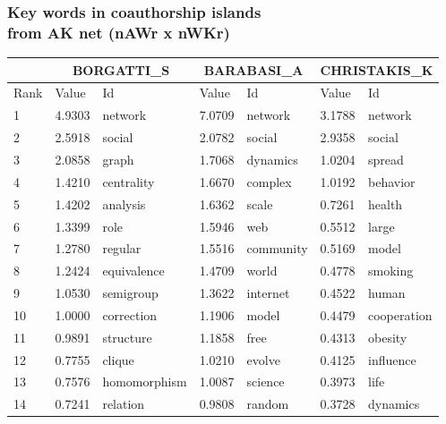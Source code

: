 \documentclass[hyperref={pdfstartview={FitBH -32768},
                         pdfpagemode=FullScreen,
                         plainpages=false,
                         colorlinks=true}
              ]{beamer}
\begin{document}
\begin{frame}[fragile]
\frametitle{Key words in coauthorship islands \\ \normalsize from AK net (nAWr x nWKr)}

\scriptsize
\renewcommand{\arraystretch}{0.84}
\begin{center}
\begin{tabular}{p{0.5cm}|p{0.8cm}|p{1.7cm}||p{0.8cm}|p{1.4cm}||p{0.8cm}|p{1.6cm}} \hline \hline
& \multicolumn{2}{c}{BORGATTI\_S}		& \multicolumn{2}{c}{BARABASI\_A}  & \multicolumn{2}{c}{CHRISTAKIS\_K}\\ \hline \hline
      Rank 	&   Value  & Id		    & 	   Value  & Id		       &	 Value  & Id	    \\ \hline
         1 	&  4.9303  & network	    &	    7.0709  & network	       &	  3.1788 &  network	    \\
         2 	&  2.5918  & social	    &	    2.0782  & social	       &	  2.9358 &  social	    \\
         3 	&  2.0858  & graph	    &	    1.7068  & dynamics	       &	  1.0204 &  spread	    \\
         4 	&  1.4210  & centrality	    &	    1.6670  & complex	       &	  1.0192 &  behavior	    \\
         5 	&  1.4202  & analysis	    &	    1.6362  & scale	       &	  0.7261 &  health	    \\
         6 	&  1.3399  & role	    &	    1.5946  & web	       &	  0.5512 &  large	    \\
         7 	&  1.2780  & regular	    &	    1.5516  & community	       &	  0.5169 &  model	    \\
         8 	&  1.2424  & equivalence    &	    1.4709  & world	       &	  0.4778 &  smoking	    \\
         9 	&  1.0530  & semigroup	    &	    1.3622  & internet	       &	  0.4522 &  human	    \\
        10 	&  1.0000  & correction	    &	    1.1906  & model	       &	  0.4479 &  cooperation	    \\
        11 	&  0.9891  & structure	    &	    1.1858  & free	       &	  0.4313 &  obesity	    \\
        12 	&  0.7755  & clique	    &	    1.0210  & evolve	       &	  0.4125 &  influence	    \\
        13 	&  0.7576  & homomorphism   &	    1.0087  & science	       &	  0.3973 &  life	    \\
        14 	&  0.7241  & relation	    &	    0.9808  & random	       &	  0.3728 &  dynamics	    \\

\end{tabular}
\end{center}
\end{frame}
\end{document}
